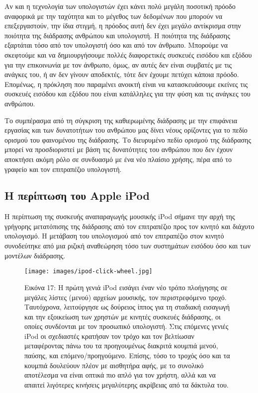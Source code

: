 \documentclass[
]{article}
\begin{document}
Αν και η τεχνολογία των υπολογιστών έχει κάνει πολύ μεγάλη ποσοτική
πρόοδο αναφορικά με την ταχύτητα και το μέγεθος των δεδομένων που
μπορούν να επεξεργαστούν, την ίδια στιγμή, η πρόοδος αυτή δεν έχει
μεγάλο αντίκρισμα στην ποιότητα της διάδρασης ανθρώπου και υπολογιστή. Η
ποιότητα της διάδρασης εξαρτάται τόσο από τον υπολογιστή όσο και από τον
άνθρωπο. Μπορούμε να σκεφτούμε και να δημιουργήσουμε πολλές διαφορετικές
συσκευές εισόδου και εξόδου για την επικοινωνία με τον άνθρωπο, όμως, αν
αυτές δεν είναι συμβατές με τις ανάγκες του, ή αν δεν γίνουν αποδεκτές,
τότε δεν έχουμε πετύχει κάποια πρόοδο. Επομένως, η πρόκληση που
παραμένει ανοικτή είναι να κατασκευάσουμε εκείνες τις συσκευές εισόδου
και εξόδου που είναι κατάλληλες για την φύση και τις ανάγκες του
ανθρώπου.

Το συμπέρασμα από τη σύγκριση της καθιερωμένης διάδρασης με την
επιφάνεια εργασίας και των δυνατοτήτων του ανθρώπου μας δίνει νέους
ορίζοντες για το πεδίο ορισμού του φαινομένου της διάδρασης. Το
διευρυμένο πεδίο ορισμού της διάδρασης μπορεί να προσδιοριστεί με βάση
τις δυνατότητες του ανθρώπου που δεν έχουν αποκτήσει ακόμη ρόλο σε
συνδυασμό με ένα νέο πλαίσιο χρήσης, πέρα από το γραφείο και τον
επιτραπέζιο υπολογιστή.

\hypertarget{ux3b7-ux3c0ux3b5ux3c1ux3afux3c0ux3c4ux3c9ux3c3ux3b7-ux3c4ux3bfux3c5-apple-ipod}{%
\subsection{Η περίπτωση του Apple
iPod}\label{ux3b7-ux3c0ux3b5ux3c1ux3afux3c0ux3c4ux3c9ux3c3ux3b7-ux3c4ux3bfux3c5-apple-ipod}}

Η περίπτωση της συσκευής αναπαραγωγής μουσικής iPod σήμανε την αρχή της
γρήγορης μετατόπισης της διάδρασης από τον επιτραπέζιο προς τον κινητό
και διάχυτο υπολογισμό. Η μετάβαση του υπολογισμού από τον επιτραπέζιο
στον κινητό συνοδεύτηκε από μια ριζική αναθεώρηση τόσο των συστημάτων
εισόδου όσο και των μοντέλων διάδρασης.

\leavevmode{}%
\begin{figure}
\hypertarget{fig:ipod-click-wheel}{%
\centering
\texttt{[image: images/ipod-click-wheel.jpg]}
\caption{Εικόνα 17: Η πρώτη γενιά iPod εισάγει έναν νέο τρόπο πλοήγησης
σε μεγάλες λίστες (μενού) αρχείων μουσικής, τον περιστρεφόμενο τροχό.
Ταυτόχρονα, λειτούργησε ως δούρειος ίππος για τη σταδιακή εισαγωγή και
την εξοικείωση των χρηστών με κινητές συσκευές διάδρασης, οι οποίες
συνδέονται με τον προσωπικό υπολογιστή. Στις επόμενες γενιές iPod οι
σχεδιαστές κρατήσαν τον τρόχο και τον βελτίωσαν μεταφέροντας πάνω του τα
προηγουμένως διακριτά κουμπιά μενού, παύσης, και επόμενο/προηγούμενο.
Επίσης, τόσο το τροχός όσο και τα κουμπιά δουλεύουν πλέον με αισθητήρα
αφής, με το συνολικό αποτέλεσμα να είναι οπτικά πιο απλό για τον χρήστη,
αλλά και να απαιτεί λιγότερες κινήσεις μεγαλύτερης ακρίβειας από τα
δάκτυλα του.}\label{fig:ipod-click-wheel}
}
\end{figure}
\end{document}
